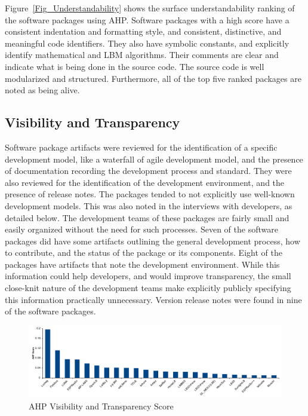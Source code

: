 \documentclass[final, 3p, times, authoryear]{elsarticle}
\begin{document}
Figure~\ref{Fig_Understandability} shows the surface understandability ranking
of the software packages using AHP. Software packages with a high score have a
consistent indentation and formatting style, and consistent, distinctive, and
meaningful code identifiers. They also have symbolic constants, and explicitly
identify mathematical and LBM algorithms. Their comments are clear and indicate
what is being done in the source code. The source code is well modularized and
structured. Furthermore, all of the top five ranked packages are noted as being
alive.

\subsection{Visibility and Transparency}

Software package artifacts were reviewed for the identification of a specific
development model, like a waterfall of agile development model, and the presence
of documentation recording the development process and standard. They were also
reviewed for the identification of the development environment, and the presence
of release notes. The packages tended to not explicitly use well-known
development models. This was also noted in the interviews with developers, as
detailed below. The development teams of these packages are fairly small and
easily organized without the need for such processes. Seven of the software
packages did have some artifacts outlining the general development process, how
to contribute, and the status of the package or its components. Eight of the
packages have artifacts that note the development environment. While this
information could help developers, and would improve transparency, the small
close-knit nature of the development teams make explicitly publicly specifying
this information practically unnecessary. Version release notes were found in
nine of the software packages.

\begin{figure}[h!]
	\begin{center}
		\includegraphics[width=1.0\textwidth]{./figures/visibilitytransparency_chart.pdf}
		\caption{AHP Visibility and Transparency Score}
		\label{Fig_VisibilityTransparency}
	\end{center}
\end{figure}
\end{document}
